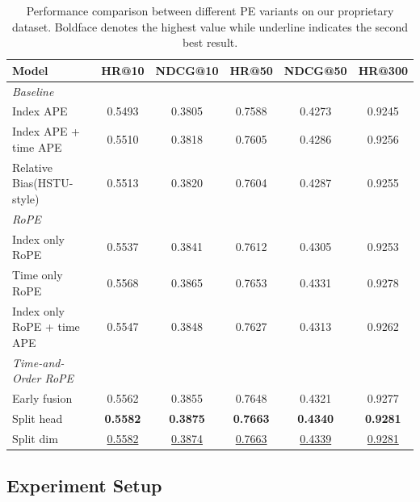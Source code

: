 \documentclass[sigconf]{acmart}
\begin{document}
\begin{table}[htbp]
\centering
\caption{Performance comparison between different PE variants on our proprietary dataset. Boldface denotes the highest value while underline indicates the second best result.}
\label{tab:rope_variants}
\renewcommand{\arraystretch}{1.2} %
\begin{tabular}{l|ccccc}
\hline
\textbf{Model} & \textbf{HR@10} & \textbf{NDCG@10} & \textbf{HR@50} & \textbf{NDCG@50} & \textbf{HR@300} \\
\hline

\textit{Baseline} & & & & & \\
Index APE & 0.5493 & 0.3805 & 0.7588 & 0.4273 & 0.9245 \\
Index APE + time APE & 0.5510 & 0.3818 & 0.7605 & 0.4286 & 0.9256 \\
Relative Bias(HSTU-style) & 0.5513 & 0.3820 & 0.7604 & 0.4287 & 0.9255 \\
\hline

\textit{RoPE} & & & & & \\
Index only RoPE & 0.5537 & 0.3841 & 0.7612 & 0.4305 & 0.9253 \\
Time only RoPE & 0.5568 & 0.3865 & 0.7653 & 0.4331 & 0.9278 \\
Index only RoPE + time APE & 0.5547 & 0.3848 & 0.7627 & 0.4313 & 0.9262 \\
\hline

\textit{Time-and-Order RoPE} & & & & & \\
Early fusion & 0.5562 & 0.3855 & 0.7648 & 0.4321 & 0.9277 \\
Split head & \textbf{0.5582} & \textbf{0.3875} & \textbf{0.7663} & \textbf{0.4340} & \textbf{0.9281} \\
Split dim & \underline{0.5582} & \underline{0.3874} & \underline{0.7663} & \underline{0.4339} & \underline{0.9281} \\
\hline
\end{tabular}
\end{table}


\subsection{Experiment Setup}
\label{ssec:setup}
\end{document}
